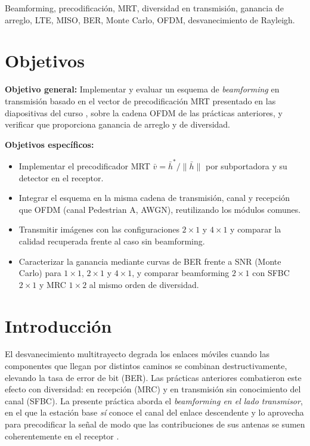 \documentclass[conference,onecolumn]{IEEEtran}
\begin{document}
\begin{IEEEkeywords}
Beamforming, precodificaci\'on, MRT, diversidad en transmisi\'on, ganancia de arreglo, LTE, MISO, BER, Monte Carlo, OFDM, desvanecimiento de Rayleigh.
\end{IEEEkeywords}

\section*{Objetivos}

\textbf{Objetivo general:} Implementar y evaluar un esquema de \textit{beamforming} en transmisi\'on basado en el vector de precodificaci\'on MRT presentado en las diapositivas del curso \cite{vazquez_cmoviles}, sobre la cadena OFDM de las pr\'acticas anteriores, y verificar que proporciona ganancia de arreglo y de diversidad.

\textbf{Objetivos espec\'ificos:}
\begin{itemize}
    \item Implementar el precodificador MRT $\bar{v}=\bar{h}^{*}/\|\bar{h}\|$ por subportadora y su detector en el receptor.
    \item Integrar el esquema en la misma cadena de transmisi\'on, canal y recepci\'on que OFDM (canal Pedestrian A, AWGN), reutilizando los m\'odulos comunes.
    \item Transmitir im\'agenes con las configuraciones $2\times1$ y $4\times1$ y comparar la calidad recuperada frente al caso sin beamforming.
    \item Caracterizar la ganancia mediante curvas de BER frente a SNR (Monte Carlo) para $1\times1$, $2\times1$ y $4\times1$, y comparar beamforming $2\times1$ con SFBC $2\times1$ y MRC $1\times2$ al mismo orden de diversidad.
\end{itemize}

\section{Introducci\'on}

El desvanecimiento multitrayecto degrada los enlaces m\'oviles cuando las componentes que llegan por distintos caminos se combinan destructivamente, elevando la tasa de error de bit (BER). Las pr\'acticas anteriores combatieron este efecto con diversidad: en recepci\'on (MRC) y en transmisi\'on sin conocimiento del canal (SFBC). La presente pr\'actica aborda el \textit{beamforming en el lado transmisor}, en el que la estaci\'on base \emph{s\'i} conoce el canal del enlace descendente y lo aprovecha para precodificar la se\~nal de modo que las contribuciones de sus antenas se sumen coherentemente en el receptor \cite{vazquez_cmoviles}.
\end{document}
